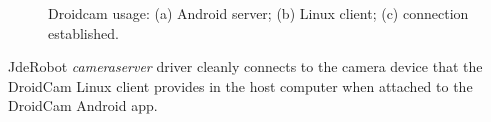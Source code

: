 \begin{figure}
\begin{subfigure}{0.33\textwidth}
		\caption{}
	\end{subfigure}
	\caption{Droidcam usage: (a) Android server; (b) Linux client; (c) connection established.}
	\label{fig:droidcam}
\end{figure}

JdeRobot \textit{cameraserver} driver cleanly connects to the camera device that the DroidCam Linux client provides in the host computer when attached to the DroidCam Android app.